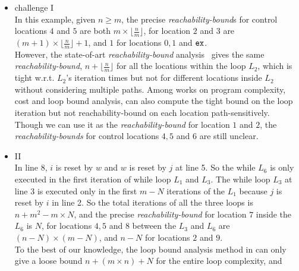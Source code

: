 \begin{itemize}
  \item challenge I
  \\
  In this example, given $n \geq m$,
the precise \emph{reachability-bound}s for control locations $4$ and $5$ are both $m \times \lfloor\frac{n}{m}\rfloor$,
for location $2$ and $3$ are $(m + 1) \times \lfloor\frac{n}{m}\rfloor + 1$, 
and $1$ for locations $0, 1$ and $\mathtt{ex}$. 
\\
However, the state-of-art \emph{reachability-bound} analysis~\cite{GulwaniZ10}
gives the same \emph{reachability-bound}, $n + \lfloor\frac{n}{m}\rfloor$ for all the locations within the loop $L_2$, which is tight w.r.t. $L_2$'s iteration times but not for different locations inside $L_2$ without considering multiple paths.
Among works on program complexity, cost and loop bound analysis, \cite{GulwaniJK09} can also compute the tight bound on the loop iteration but not reachability-bound on each location path-sensitively.
Though we can use it as the \emph{reachability-bound} for location $1$ and $2$,
the \emph{reachability-bounds} for control locations $4, 5$ and $6$ are still unclear.
  \item II
  \\
  In line 8, $i$ is reset by $w$ and $w$ is reset by $j$ at line 5. So the
while $L_6$ is only executed in the first iteration of while loop $L_1$ and $L_3$.
The while loop $L_3$ at line 3 is executed only in 
the first $m - N$ iterations of the 
$L_1$ because $j$ is reset by $i$ in line 2.
So the total iterations of all the three loops is
$n + m^2 - m \times N$,
and the precise \emph{reachability-bound} for location $7$ inside the $L_6$ is $N$,
for locations $4, 5$ and $8$ between the $L_3$ and $L_6$ are $(n-N) \times (m - N)$,
and $n - N$ for locations $2$ and $9$.
\\
To the best of our knowledge, the loop bound analysis method in \cite{GulwaniJK09} can only give a loose bound $n + (m \times n) + N$ for the entire loop complexity, and 

\end{itemize}
